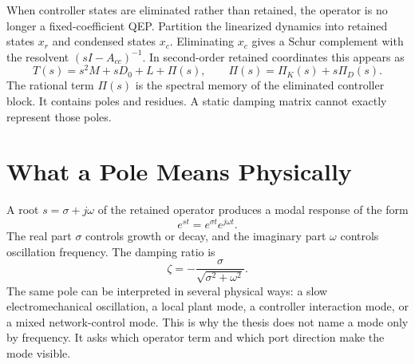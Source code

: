 When controller states are eliminated rather than retained, the operator is no
longer a fixed-coefficient QEP. Partition the linearized dynamics into retained
states \(x_r\) and condensed states \(x_c\). Eliminating \(x_c\) gives a Schur
complement with the resolvent \((sI-A_{cc})^{-1}\). In second-order retained
coordinates this appears as
\begin{equation}
  T(s)=s^2M+sD_0+L+\Pi(s),
  \qquad
  \Pi(s)=\Pi_K(s)+s\Pi_D(s).
  \label{eq:framework_nep}
\end{equation}
The rational term \(\Pi(s)\) is the spectral memory of the eliminated
controller block. It contains poles and residues. A static damping matrix
cannot exactly represent those poles.

\section{What a Pole Means Physically}

A root \(s=\sigma+j\omega\) of the retained operator produces a modal response
of the form
\[
  e^{st}=e^{\sigma t}e^{j\omega t}.
\]
The real part \(\sigma\) controls growth or decay, and the imaginary part
\(\omega\) controls oscillation frequency. The damping ratio is
\begin{equation}
  \zeta=-\frac{\sigma}{\sqrt{\sigma^2+\omega^2}} .
  \label{eq:framework_damping_ratio}
\end{equation}
The same pole can be interpreted in several physical ways: a slow
electromechanical oscillation, a local plant mode, a controller interaction
mode, or a mixed network-control mode. This is why the thesis does not name a
mode only by frequency. It asks which operator term and which port direction
make the mode visible.

